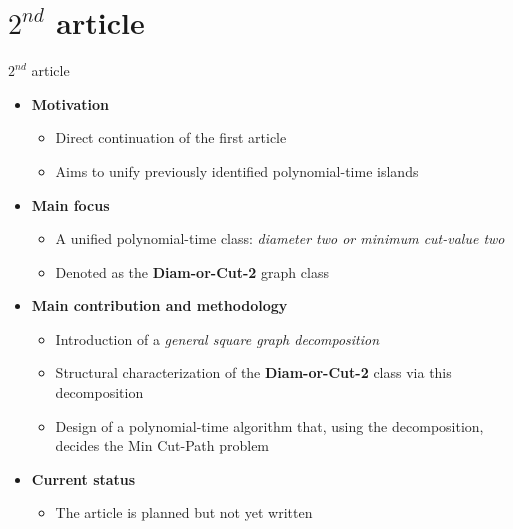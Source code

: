 \documentclass [xcolor=svgnames, t] {beamer}
\begin{document}
\section{$2^{nd}$ article}

\begin{frame}{$2^{nd}$ article}
\begin{itemize}
    \item \textbf{Motivation}
    \begin{itemize}
        \item Direct continuation of the first article
        \item Aims to unify previously identified polynomial-time islands
    \end{itemize}

    \item \textbf{Main focus}
    \begin{itemize}
        \item A unified polynomial-time class: \emph{diameter two or minimum cut-value two}
        \item Denoted as the \textbf{Diam-or-Cut-2} graph class
    \end{itemize}

    \item \textbf{Main contribution and methodology}
    \begin{itemize}
        \item Introduction of a \emph{general square graph decomposition}
        \item Structural characterization of the \textbf{Diam-or-Cut-2} class via this decomposition
        \item Design of a polynomial-time algorithm that, using the decomposition,
              decides the Min Cut-Path problem
    \end{itemize}

    \vspace{0.3cm}
    \item \textbf{Current status}
    \begin{itemize}
        \item The article is planned but not yet written
    \end{itemize}
\end{itemize}
\end{frame}
\end{document}
